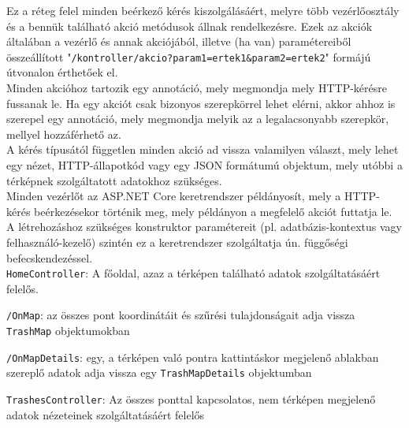 Ez a réteg felel minden beérkező kérés kiszolgálásáért, melyre több vezérlőosztály és a bennük található akció metódusok állnak rendelkezésre. Ezek az akciók általában a vezérlő és annak akciójából, illetve (ha van) paramétereiből összeállított "\texttt{/kontroller/akcio?param1=ertek1\&param2=ertek2}" formájú útvonalon érthetőek el.\\
Minden akcióhoz tartozik egy annotáció, mely megmondja mely HTTP-kérésre fussanak le. Ha egy akciót csak bizonyos szerepkörrel lehet elérni, akkor ahhoz is szerepel egy annotáció, mely megmondja melyik az a legalacsonyabb szerepkör, mellyel hozzáférhető az.\\
A kérés típusától független minden akció ad vissza valamilyen választ, mely lehet egy nézet, HTTP-állapotkód vagy egy JSON formátumú objektum, mely utóbbi a térképnek szolgáltatott adatokhoz szükséges.\\
Minden vezérlőt az ASP.NET Core keretrendszer példányosít, mely a HTTP-kérés beérkezésekor történik meg, mely példányon a megfelelő akciót futtatja le. A létrehozáshoz szükséges konstruktor paramétereit (pl. adatbázis-kontextus vagy felhasználó-kezelő) szintén ez a keretrendszer szolgáltatja ún. függőségi befecskendezéssel.\\
\texttt{HomeController}: A főoldal, azaz a térképen található adatok szolgáltatásáért felelős.
\begin{compactitem}
	\item \texttt{/OnMap}: az összes pont koordinátáit és szűrési tulajdonságait adja vissza \texttt{TrashMap} objektumokban
	\item \texttt{/OnMapDetails}: egy, a térképen való pontra kattintáskor megjelenő ablakban szereplő adatok adja vissza egy \texttt{TrashMapDetails} objektumban
\end{compactitem}
\texttt{TrashesController}: Az összes ponttal kapcsolatos, nem térképen megjelenő adatok nézeteinek szolgáltatásáért felelős
